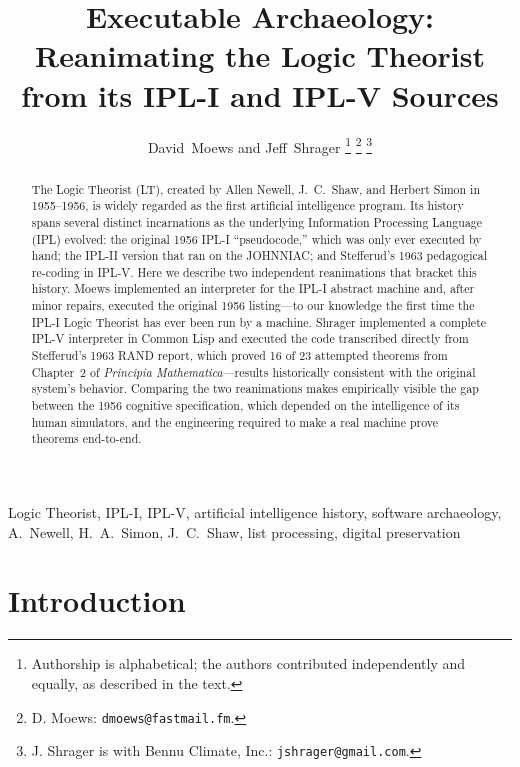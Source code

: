 \documentclass[journal]{IEEEtran}
\begin{document}
\title{Executable Archaeology: Reanimating the Logic Theorist from its
  IPL-I and IPL-V Sources}

\author{David~Moews and Jeff~Shrager%
\thanks{Authorship is alphabetical; the authors contributed
  independently and equally, as described in the text.}%
\thanks{D. Moews: \texttt{dmoews@fastmail.fm}.} %
\thanks{J. Shrager is with Bennu Climate, Inc.:
  \texttt{jshrager@gmail.com}.}}

\maketitle

\begin{abstract}

The Logic Theorist (LT), created by Allen Newell, J.~C.~Shaw, and
Herbert Simon in 1955--1956, is widely regarded as the first
artificial intelligence program. Its history spans several distinct
incarnations as the underlying Information Processing Language (IPL)
evolved: the original 1956 IPL-I ``pseudocode,'' which was only ever
executed by hand; the IPL-II version that ran on the JOHNNIAC; and
Stefferud's 1963 pedagogical re-coding in IPL-V. Here we describe two
independent reanimations that bracket this history. Moews implemented
an interpreter for the IPL-I abstract machine and, after minor
repairs, executed the original 1956 listing---to our knowledge the
first time the IPL-I Logic Theorist has ever been run by a
machine. Shrager implemented a complete IPL-V interpreter in Common
Lisp and executed the code transcribed directly from Stefferud's 1963
RAND report, which proved 16 of 23 attempted theorems from Chapter~2
of \textit{Principia Mathematica}---results historically consistent
with the original system's behavior. Comparing the two reanimations
makes empirically visible the gap between the 1956 cognitive
specification, which depended on the intelligence of its human
simulators, and the engineering required to make a real machine prove
theorems end-to-end.

\end{abstract}


\begin{IEEEkeywords}
Logic Theorist, IPL-I, IPL-V, artificial intelligence history,
software archaeology, A.~Newell, H.~A.~Simon, J.~C.~Shaw, list
processing, digital preservation
\end{IEEEkeywords}

\section{Introduction}
\label{sec:intro}
\end{document}
